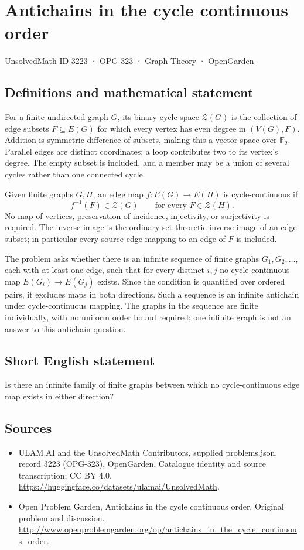 \documentclass[11pt,a4paper]{article}
\begin{document}
\section*{Antichains in the cycle continuous order}\label{3223}
{\small UnsolvedMath ID 3223 · OPG-323 · Graph Theory · OpenGarden}
\subsection{Definitions and mathematical statement}
For a finite undirected graph $G$, its binary cycle space $\mathcal Z(G)$ is the collection of edge subsets $F\subseteq E(G)$ for which every vertex has even degree in $(V(G),F)$. Addition is symmetric difference of subsets, making this a vector space over $\mathbb F_2$. Parallel edges are distinct coordinates; a loop contributes two to its vertex's degree. The empty subset is included, and a member may be a union of several cycles rather than one connected cycle.

Given finite graphs $G,H$, an edge map $f:E(G)\to E(H)$ is cycle-continuous if
\[
            f^{-1}(F)\in\mathcal Z(G)
            \qquad\text{for every }F\in\mathcal Z(H).
\]
No map of vertices, preservation of incidence, injectivity, or surjectivity is required. The inverse image is the ordinary set-theoretic inverse image of an edge subset; in particular every source edge mapping to an edge of $F$ is included.

The problem asks whether there is an infinite sequence of finite graphs $G_1,G_2,\ldots$, each with at least one edge, such that for every distinct $i,j$ no cycle-continuous map $E(G_i)\to E(G_j)$ exists. Since the condition is quantified over ordered pairs, it excludes maps in both directions. Such a sequence is an infinite antichain under cycle-continuous mapping. The graphs in the sequence are finite individually, with no uniform order bound required; one infinite graph is not an answer to this antichain question.
\subsection{Short English statement}
Is there an infinite family of finite graphs between which no cycle-continuous edge map exists in either direction?
\subsection{Sources}
\begin{itemize}
\item[S1] ULAM.AI and the UnsolvedMath Contributors, supplied problems.json, record 3223 (OPG-323), OpenGarden. Catalogue identity and source transcription; CC BY 4.0.
\url{https://huggingface.co/datasets/ulamai/UnsolvedMath}.
\item[S2] Open Problem Garden, Antichains in the cycle continuous order. Original problem and discussion.
\url{http://www.openproblemgarden.org/op/antichains_in_the_cycle_continuous_order}.
\end{itemize}
\end{document}
